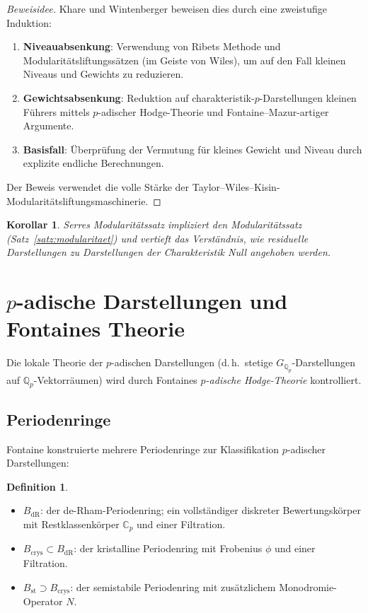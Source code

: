 \documentclass[a4paper,12pt]{amsart}
\newtheorem{korollar}[theorem]{Korollar}
\theoremstyle{definition}
\newtheorem{definition}[theorem]{Definition}
\theoremstyle{remark}
\newcommand{\Q}{\mathbb{Q}}
\newcommand{\BdR}{B_{\mathrm{dR}}}
\newcommand{\Bcrys}{B_{\mathrm{crys}}}
\begin{document}
\begin{proof}[Beweisidee]
Khare und Wintenberger beweisen dies durch eine zweistu\-fige Induktion:
\begin{enumerate}[label=(\alph*)]
\item \textbf{Niveauabsenkung}: Verwendung von Ribets Methode und Modularitätsliftungs\-sätzen
  (im Geiste von Wiles), um auf den Fall kleinen Niveaus und Gewichts zu reduzieren.
\item \textbf{Gewichtsabsenkung}: Reduktion auf charakteristik-$p$-Darstellungen
  kleinen Führers mittels $p$-adischer Hodge-Theorie und Fontaine--Mazur-artiger Argumente.
\item \textbf{Basisfall}: Überprüfung der Vermutung für kleines Gewicht und Niveau
  durch explizite endliche Berechnungen.
\end{enumerate}
Der Beweis verwendet die volle Stärke der Taylor--Wiles--Kisin-Modularitätsliftungs\-maschinerie.
\end{proof}

\begin{korollar}
Serres Modularitätssatz impliziert den Modularitätssatz (Satz~\ref{satz:modularitaet})
und vertieft das Verständnis, wie residuelle Darstellungen zu Darstellungen der
Charakteristik Null angehoben werden.
\end{korollar}

\section{\texorpdfstring{$p$}{p}-adische Darstellungen und Fontaines Theorie}
\label{sec:fontaine}

Die lokale Theorie der $p$-adischen Darstellungen (d.\,h.\ stetige
$G_{\Q_p}$-Darstellungen auf $\Q_p$-Vektorräumen) wird durch Fontaines
\emph{$p$-adische Hodge-Theorie} kontrolliert.

\subsection{Periodenringe}

Fontaine konstruierte mehrere Periodenringe zur Klassifikation $p$-adischer Darstellungen:

\begin{definition}
\begin{itemize}
  \item $\BdR$: der de-Rham-Periodenring; ein vollständiger diskreter Bewertungskörper
    mit Restklassenkörper $\mathbb{C}_p$ und einer Filtration.
  \item $\Bcrys \subset \BdR$: der kristalline Periodenring mit Frobenius $\phi$
    und einer Filtration.
  \item $B_{\mathrm{st}} \supset \Bcrys$: der semistabile Periodenring mit
    zusätzlichem Monodromie-Operator $N$.
\end{itemize}
\end{definition}
\end{document}
